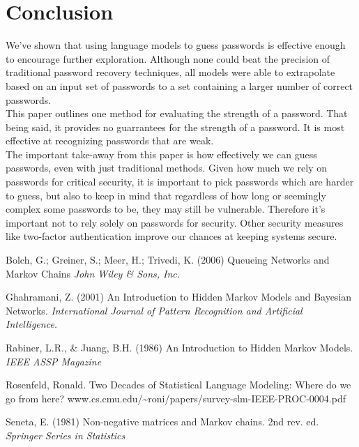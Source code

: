 \documentclass{amsart}
\theoremstyle{definition}
\theoremstyle{remark}
\numberwithin{equation}{section}
\begin{document}
\section{Conclusion}
We've shown that using language models to guess passwords is effective enough to encourage further exploration. Although none could beat the precision of traditional password recovery techniques, all models were able to extrapolate based on an input set of passwords to a set containing a larger number of correct passwords.\\
This paper outlines one method for evaluating the strength of a password. That being said, it provides no guarrantees for the strength of a password. It is most effective at recognizing passwords that are weak.\\
The important take-away from this paper is how effectively we can guess passwords, even with just traditional methods. Given how much we rely on passwords for critical security, it is important to pick passwords which are harder to guess, but also to keep in mind that regardless of how long or seemingly complex some passwords to be, they may still be vulnerable. Therefore it's important not to rely solely on passwords for security. Other security measures like two-factor authentication improve our chances at keeping systems secure.\\

\newpage

\begin{thebibliography}{9}
Bolch, G.; Greiner, S.; Meer, H.; Trivedi, K. (2006) Queueing Networks and Markov Chains
\textit{John Wiley \& Sons, Inc.}

Ghahramani, Z. (2001) An Introduction to Hidden Markov Models and Bayesian Networks.
\textit{International Journal of Pattern Recognition and Artificial Intelligence.}

Rabiner, L.R., \& Juang, B.H. (1986) An Introduction to Hidden Markov Models.
\textit{IEEE ASSP Magazine}

Rosenfeld, Ronald. Two Decades of Statistical Language Modeling: Where do we go from here?
www.cs.cmu.edu/\textasciitilde{}roni/papers/survey-slm-IEEE-PROC-0004.pdf

Seneta, E. (1981) Non-negative matrices and Markov chains. 2nd rev. ed.
\textit{Springer Series in Statistics}

\end{thebibliography}
\end{document}
